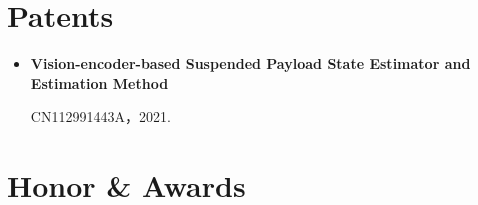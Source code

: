 \documentclass[11pt,a4paper,sans]{moderncv}        %
\begin{document}
\section{Patents}


\begin{itemize}
    \item{\textbf{Vision-encoder-based Suspended Payload State Estimator and Estimation Method}
    
    CN112991443A，2021.
    }

\end{itemize}

\section{Honor \& Awards}

\end{document}
